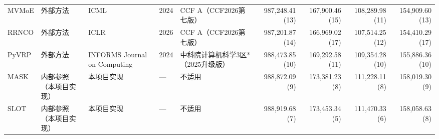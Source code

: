 \begin{table}[t]
\begin{tabular}{lllllrrrr}
MVMoE & 外部方法 & ICML & 2024 & CCF A（CCF2026第七版） & 987,248.41 (13) & 167,900.46 (15) & 108,289.98 (11) & 154,909.60 (13) \\
RRNCO & 外部方法 & ICLR & 2026 & CCF A（CCF2026第七版） & 987,201.87 (14) & 166,969.02 (17) & 107,514.25 (12) & 154,410.29 (17) \\
PyVRP & 外部方法 & INFORMS Journal on Computing & 2024 & 中科院计算机科学3区*（2025升级版） & 988,473.85 (10) & 169,292.58 (11) & 109,354.28 (10) & 155,886.36 (10) \\
MASK & 内部参照（本项目实现） & 本项目实现 & — & 不适用 & 988,872.09 (9) & 173,381.23 (8) & 111,228.11 (8) & 158,019.30 (9) \\
SLOT & 内部参照（本项目实现） & 本项目实现 & — & 不适用 & 988,919.68 (7) & 173,453.34 (5) & 111,470.33 (6) & 158,058.63 (8) \\
\bottomrule
\end{tabular}
\end{table}
